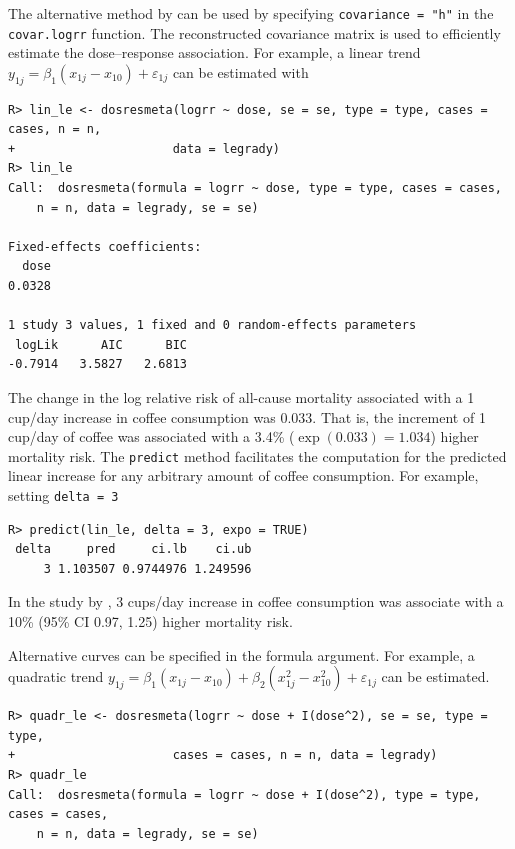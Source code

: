 \documentclass[11pt,a4paper,twoside,openany]{book}\usepackage{knitr}
\begin{document}
{{\noindent The alternative method by \cite{hamling2008facilitating} can be used by specifying \texttt{covariance = "h"} in the \texttt{covar.logrr} function. The reconstructed covariance matrix is used to efficiently estimate the dose--response association. For example, a linear trend $y_{1j} = \beta_1 (x_{1j} - x_{10}) + \varepsilon_{1j}$ can be estimated with

\begin{knitrout}\footnotesize
{}\color{fgcolor}\begin{kframe}
\begin{verbatim}
R> lin_le <- dosresmeta(logrr ~ dose, se = se, type = type, cases = cases, n = n, 
+                      data = legrady)
R> lin_le
Call:  dosresmeta(formula = logrr ~ dose, type = type, cases = cases, 
    n = n, data = legrady, se = se)

Fixed-effects coefficients:
  dose  
0.0328  

1 study 3 values, 1 fixed and 0 random-effects parameters
 logLik      AIC      BIC  
-0.7914   3.5827   2.6813  
\end{verbatim}
\end{kframe}
\end{knitrout}


\noindent The change in the log relative risk of all-cause mortality associated with a 1 cup/day increase in coffee consumption was 0.033. That is, the increment of 1 cup/day of coffee was associated with a 3.4\%
($\exp(0.033) = 1.034$) higher mortality risk. 
The \texttt{predict} method facilitates the computation for the predicted linear increase for any arbitrary amount of coffee consumption. For example, setting \texttt{delta = 3}

\begin{knitrout}\footnotesize
{}\color{fgcolor}\begin{kframe}
\begin{verbatim}
R> predict(lin_le, delta = 3, expo = TRUE)
 delta     pred     ci.lb    ci.ub
     3 1.103507 0.9744976 1.249596
\end{verbatim}
\end{kframe}
\end{knitrout}


\noindent In the study by \cite{legrady1987coffee}, 3 cups/day increase in coffee consumption was associate with a 10\% (95\% CI 0.97, 1.25) higher mortality risk.

Alternative curves can be specified in the formula argument. For example, a quadratic trend $y_{1j} = \beta_1 (x_{1j} - x_{10}) + \beta_2 (x_{1j}^2 - x_{10}^2) + \varepsilon_{1j}$ can be estimated.
\begin{knitrout}\footnotesize
{}\color{fgcolor}\begin{kframe}
\begin{verbatim}
R> quadr_le <- dosresmeta(logrr ~ dose + I(dose^2), se = se, type = type,
+                      cases = cases, n = n, data = legrady)
R> quadr_le
Call:  dosresmeta(formula = logrr ~ dose + I(dose^2), type = type, cases = cases, 
    n = n, data = legrady, se = se)


\end{verbatim}
\end{kframe}
\end{knitrout}}}
\end{document}
